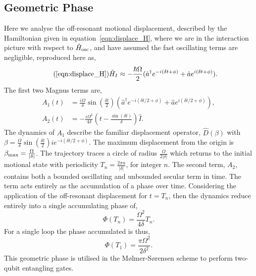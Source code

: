 \subsection{Geometric Phase}
\label{app:geometric_phase}
    Here we analyse the off-resonant motional displacement, described by the Hamiltonian given in equation~\ref{eqn:displace_H}, where we are in the interaction picture with respect to $\hat H_{\rm osc}$, and have assumed the fast oscillating terms are negligible, reproduced here as,
    \begin{equation}
        \tag{\ref{eqn:displace_H}}
        \tilde H_I \approx -\frac{\hbar \Omega}{2}(\hat a^\dagger e^{-i(\delta t+\phi)}+\hat ae^{i(\delta t+\phi)}).
    \end{equation}
    The first two Magnus terms are,
    \begin{subequations}
    \begin{align}
        A_1(t) &= \frac{i\Omega}{\delta}\sin\left(\frac{\delta t}{2}\right)\left(\hat a^\dagger e^{-i(\delta t/2 + \phi)} + \hat ae^{i(\delta t/2 + \phi)}  \right),\\
        A_2(t) &= -\frac{i\Omega^2}{4\delta}\left(t-\frac{\sin(\delta t)}{\delta}\right)\hat I.
    \end{align}
\end{subequations}
    The dynamics of $A_1$ describe the familiar displacement operator, $\hat D(\beta)$ 
    with $\beta = \frac{\Omega}{\delta}\sin\left(\frac{\delta t}{2}\right)ie^{-i(\delta t/2 + \phi)}$. 
    The maximum displacement from the origin 
    is $\beta_{\rm  max} = \frac{\Omega}{|\delta|}$. The trajectory traces a circle of radius $\frac{\Omega}{2|\delta|}$ which returns to the
    initial motional state with periodicity $T_n = \frac{2\pi n}{|\delta|}$, for integer $n$. The
    second term, $A_2$, contains both a bounded oscillating and unbounded
    secular term in time. The term acts entirely as the accumulation of a phase
    over time. Considering the application of the off-resonant displacement for
    $t = T_n$, then the dynamics reduce entirely into a single
    accumulating phase of,
    \begin{equation}
        \Phi(T_n) = \frac{\Omega^2}{4\delta}T_n.
    \end{equation}
    For a single loop the phase accumulated is thus,
    \begin{equation}
        \Phi(T_1) = \frac{\pi\Omega^2}{2\delta^2}.
    \end{equation}
    This geometric phase is utilised in the M{\o}lmer-S{\o}rensen scheme to perform two-qubit entangling gates.

